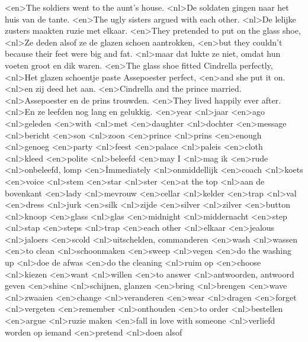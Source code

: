<en>The soldiers went  to the aunt’s house.
<nl>De soldaten gingen naar het huis van de tante.
<en>The ugly sisters argued with each other.
<nl>De lelijke zusters maakten ruzie met elkaar.
<en>They pretended to put on the glass shoe, 
<nl>Ze deden alsof ze de glazen schoen aantrokken,
<en>but they couldn’t because their feet were big and fat.
<nl>maar dat lukte ze niet, omdat hun voeten groot en dik waren.
<en>The glass shoe fitted Cindrella perfectly,
<nl>Het glazen schoentje paste Assepoester perfect,
<en>and she put it on.
<nl>en zij deed het aan.
<en>Cindrella and the prince married.
<nl>Assepoester en de prins trouwden.
<en>They lived happily ever after.
<nl>En ze leefden nog lang en gelukkig.
<en>year
<nl>jaar
<en>ago
<nl>geleden
<en>with
<nl>met
<en>daughter
<nl>dochter
<en>message
<nl>bericht
<en>son
<nl>zoon
<en>prince
<nl>prins
<en>enough
<nl>genoeg
<en>party
<nl>feest
<en>palace
<nl>paleis
<en>cloth
<nl>kleed
<en>polite
<nl>beleefd
<en>may I
<nl>mag ik
<en>rude
<nl>onbeleefd, lomp
<en>İmmediately
<nl>onmiddellijk
<en>coach
<nl>koets
<en>voice
<nl>stem
<en>star
<nl>ster
<en>at the top
<nl>aan de bovenkant
<en>lady
<nl>mevrouw
<en>cellar
<nl>kelder
<en>trap
<nl>val
<en>dress
<nl>jurk
<en>silk
<nl>zijde
<en>silver
<nl>zilver
<en>button
<nl>knoop
<en>glass
<nl>glas
<en>midnight
<nl>middernacht
<en>step
<nl>stap
<en>steps
<nl>trap
<en>each other
<nl>elkaar
<en>jealous
<nl>jaloers
<en>scold
<nl>uitschelden, commanderen
<en>wash
<nl>wassen
<en>to clean
<nl>schoonmaken
<en>sweep
<nl>vegen
<en>do the washing up
<nl>doe de afwas
<en>do the cleaning
<nl>ruim op
<en>choose
<nl>kiezen
<en>want
<nl>willen
<en>to answer
<nl>antwoorden, antwoord geven
<en>shine
<nl>schijnen, glanzen
<en>bring
<nl>brengen
<en>wave
<nl>zwaaien
<en>change
<nl>veranderen
<en>wear
<nl>dragen
<en>forget
<nl>vergeten
<en>remember
<nl>onthouden
<en>to order
<nl>bestellen
<en>argue
<nl>ruzie maken
<en>fall in love with someone
<nl>verliefd worden op iemand
<en>pretend
<nl>doen alsof
